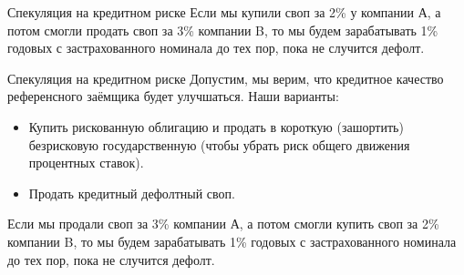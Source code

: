 \documentclass{beamer}
\begin{document}
\begin{frame}{Спекуляция на кредитном риске}
\justify
Если мы купили своп за 2\% у компании А, а потом смогли продать своп за 3\% компании B, то мы будем зарабатывать 1\% годовых с застрахованного номинала до тех пор, пока не случится дефолт.

\justify
\centering
{}
\end{frame}



\begin{frame}{Спекуляция на кредитном риске}
\justify
Допустим, мы верим, что кредитное качество референсного заёмщика будет улучшаться. Наши варианты:
\begin{itemize}
\justifying
\item Купить рискованную облигацию и продать в короткую (зашортить) безрисковую государственную (чтобы убрать риск общего движения процентных ставок).
\item Продать кредитный дефолтный своп.
\end{itemize}

\justify
Если мы продали своп за 3\% компании А, а потом смогли купить своп за 2\% компании B, то мы будем зарабатывать 1\% годовых с застрахованного номинала до тех пор, пока не случится дефолт.
\end{frame}
\end{document}

